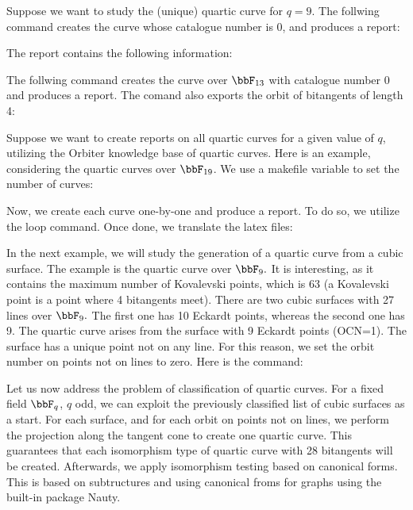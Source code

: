 \bigskip


Suppose we want to study the (unique) quartic curve for $q=9$.
The follwing command creates the curve whose catalogue number is 0, and produces a report:
{\tt

}
The report contains the following information:
\begin{mdframed}[style=MyFrame]

\end{mdframed}


\bigskip

The follwing command creates the curve over $\bbF_{13}$ with catalogue number 0 
and produces a report. The comand also exports the orbit of bitangents of length 4:
{\tt

}


\bigskip


Suppose we want to create reports on all quartic curves for a given value of $q$, 
utilizing the Orbiter knowledge base of quartic curves.
Here is an example, considering the quartic curves over $\bbF_{19}$. 
We use a makefile variable to set the number of curves:
{\tt

}
Now, we create each curve one-by-one and produce a report. 
To do so, we utilize the loop command. 
Once done, we translate the latex files:
{\tt

}


\bigskip

In the next example, we will study the generation 
of a quartic curve from a cubic surface. 
The example is the quartic curve over $\bbF_9.$ 
It is interesting, as it contains the maximum number of Kovalevski points, 
which is 63 (a Kovalevski point is a point where 4 bitangents meet). 
There are two cubic surfaces with 27 lines over $\bbF_9.$ 
The first one has 10 Eckardt points, 
whereas the second one has 9. 
The quartic curve arises from the surface with 9 Eckardt points (OCN=1). 
The surface has a unique point not on any line. 
For this reason, we set the orbit number 
on points not on lines to zero. Here is the command:
{\tt

}


\bigskip

Let us now address the problem of classification of quartic curves.
For a fixed field $\bbF_q$, $q$ odd, 
we can exploit the previously classified list 
of cubic surfaces as a start. 
For each surface, and for each orbit on points not on lines, 
we perform the projection along the tangent cone to create one quartic curve. 
This guarantees that each isomorphism type of quartic curve with 28 bitangents will be created.
Afterwards, we apply isomorphism testing based on canonical forms. 
This is based on subtructures 
and using canonical froms for graphs using the built-in package Nauty.

